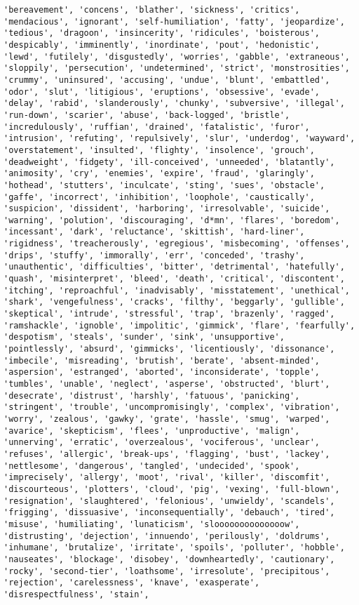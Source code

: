 \documentclass[11pt]{article}
\begin{document}
\begin{Verbatim}[commandchars=\\\{\}]
'bereavement', 'concens', 'blather', 'sickness', 'critics', 'mendacious', 'ignorant', 'self-humiliation', 'fatty', 'jeopardize', 'tedious', 'dragoon', 'insincerity', 'ridicules', 'boisterous', 'despicably', 'imminently', 'inordinate', 'pout', 'hedonistic', 'lewd', 'futilely', 'disgustedly', 'worries', 'gabble', 'extraneous', 'sloppily', 'persecution', 'undetermined', 'strict', 'monstrosities', 'crummy', 'uninsured', 'accusing', 'undue', 'blunt', 'embattled', 'odor', 'slut', 'litigious', 'eruptions', 'obsessive', 'evade', 'delay', 'rabid', 'slanderously', 'chunky', 'subversive', 'illegal', 'run-down', 'scarier', 'abuse', 'back-logged', 'bristle', 'incredulously', 'ruffian', 'drained', 'fatalistic', 'furor', 'intrusion', 'refuting', 'repulsively', 'slur', 'underdog', 'wayward', 'overstatement', 'insulted', 'flighty', 'insolence', 'grouch', 'deadweight', 'fidgety', 'ill-conceived', 'unneeded', 'blatantly', 'animosity', 'cry', 'enemies', 'expire', 'fraud', 'glaringly', 'hothead', 'stutters', 'inculcate', 'sting', 'sues', 'obstacle', 'gaffe', 'incorrect', 'inhibition', 'loophole', 'caustically', 'suspicion', 'dissident', 'harboring', 'irresolvable', 'suicide', 'warning', 'polution', 'discouraging', 'd*mn', 'flares', 'boredom', 'incessant', 'dark', 'reluctance', 'skittish', 'hard-liner', 'rigidness', 'treacherously', 'egregious', 'misbecoming', 'offenses', 'drips', 'stuffy', 'immorally', 'err', 'conceded', 'trashy', 'unauthentic', 'difficulties', 'bitter', 'detrimental', 'hatefully', 'quash', 'misinterpret', 'bleed', 'death', 'critical', 'discontent', 'itching', 'reproachful', 'inadvisably', 'misstatement', 'unethical', 'shark', 'vengefulness', 'cracks', 'filthy', 'beggarly', 'gullible', 'skeptical', 'intrude', 'stressful', 'trap', 'brazenly', 'ragged', 'ramshackle', 'ignoble', 'impolitic', 'gimmick', 'flare', 'fearfully', 'despotism', 'steals', 'sunder', 'sink', 'unsupportive', 'pointlessly', 'absurd', 'gimmicks', 'licentiously', 'dissonance', 'imbecile', 'misreading', 'brutish', 'berate', 'absent-minded', 'aspersion', 'estranged', 'aborted', 'inconsiderate', 'topple', 'tumbles', 'unable', 'neglect', 'asperse', 'obstructed', 'blurt', 'desecrate', 'distrust', 'harshly', 'fatuous', 'panicking', 'stringent', 'trouble', 'uncompromisingly', 'complex', 'vibration', 'worry', 'zealous', 'gawky', 'grate', 'hassle', 'smug', 'warped', 'avarice', 'skepticism', 'flees', 'unproductive', 'malign', 'unnerving', 'erratic', 'overzealous', 'vociferous', 'unclear', 'refuses', 'allergic', 'break-ups', 'flagging', 'bust', 'lackey', 'nettlesome', 'dangerous', 'tangled', 'undecided', 'spook', 'imprecisely', 'allergy', 'moot', 'rival', 'killer', 'discomfit', 'discourteous', 'plotters', 'cloud', 'pig', 'vexing', 'full-blown', 'resignation', 'slaughtered', 'felonious', 'unwieldy', 'scandels', 'frigging', 'dissuasive', 'inconsequentially', 'debauch', 'tired', 'misuse', 'humiliating', 'lunaticism', 'sloooooooooooooow', 'distrusting', 'dejection', 'innuendo', 'perilously', 'doldrums', 'inhumane', 'brutalize', 'irritate', 'spoils', 'polluter', 'hobble', 'nauseates', 'blockage', 'disobey', 'downheartedly', 'cautionary', 'rocky', 'second-tier', 'loathsome', 'irresolute', 'precipitous', 'rejection', 'carelessness', 'knave', 'exasperate', 'disrespectfulness', 'stain', 
\end{Verbatim}
\end{document}
